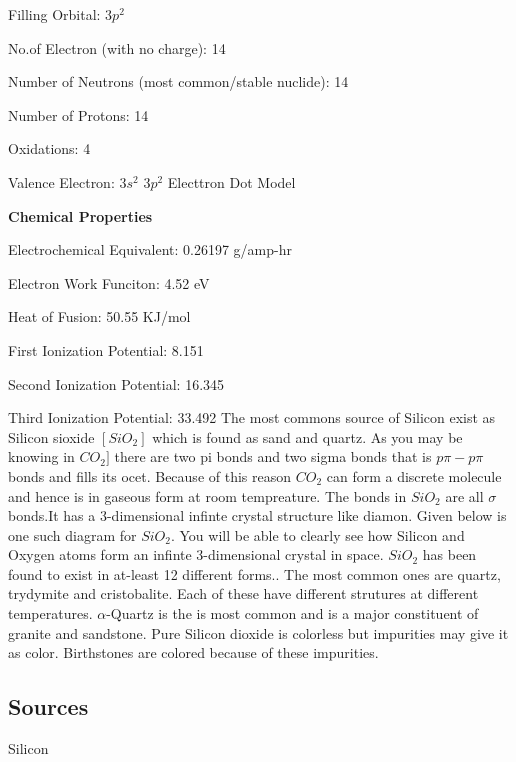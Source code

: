 \item Filling Orbital: $3p^2$
\item No.of Electron (with no charge): 14
\item Number of Neutrons (most common/stable nuclide): 14
\item Number of Protons: 14
\item Oxidations: 4
\item Valence Electron: $3s^2$ $3p^2$
Electtron Dot Model
\hfil\break
\blank[1mm]
\stopitemize
\startitemize[r]
\item {\bf Chemical Properties}
\item Electrochemical Equivalent: 0.26197 g/amp-hr
\item Electron Work Funciton: 4.52 eV
\item Heat of Fusion: 50.55 KJ/mol
\item First Ionization Potential: 8.151
\item Second Ionization Potential: 16.345
\item Third Ionization Potential: 33.492
\stopitemize
\stopitemize
The most commons source of Silicon exist as Silicon sioxide $[SiO_2]$
which is found as sand and quartz. As you may be knowing in $CO_2]$
there are two pi bonds and two sigma bonds that is $p\pi - p\pi$ bonds
and fills its ocet. Because of this reason $CO_2$ can form a discrete
molecule and hence is in gaseous form at room tempreature. The bonds
in $SiO_2$ are all $\sigma$ bonds.It has a 3-dimensional infinte
crystal structure like diamon. Given below is one such diagram for
$SiO_2$. You will be able to clearly see how Silicon and Oxygen atoms
form an infinte 3-dimensional crystal in space. $SiO_2$ has been found
to exist in at-least 12 different forms.. The most common ones are quartz,
trydymite and cristobalite. Each of these have different strutures at
different temperatures.
\hfil\break
\blank[1mm]
$\alpha$-Quartz is the is most common and is a major constituent of
granite and sandstone. Pure Silicon dioxide is colorless but
impurities may give it as color. Birthstones are colored because of
these impurities.
\subsection{Sources}
Silicon
